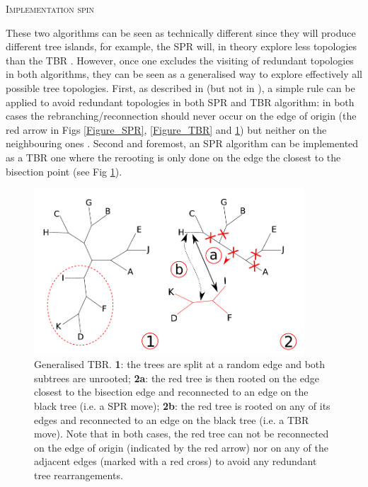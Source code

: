 \documentclass[12pt,letterpaper]{article}
\renewcommand{\section}[1]{%
\bigskip
\begin{center}
\begin{Large}
\normalfont\scshape #1
\medskip
\end{Large}
\end{center}}
\begin{document}
\section{Implementation spin}
These two algorithms can be seen as technically different since they will produce different tree islands, for example, the SPR will, in theory explore less topologies than the TBR \citep[see above and][]{morrison2007increasing,lakner2008efficiency}.
However, once one excludes the visiting of redundant topologies in both algorithms, they can be seen as a generalised way to explore effectively all possible tree topologies.
First, as described in \cite{allen2001subtree} (but not in \citealt{felsenstein2004inferring}), a simple rule can be applied to avoid redundant topologies in both SPR and TBR algorithm: in both cases the rebranching/reconnection should never occur on the edge of origin (the red arrow in Figs \ref{Figure_SPR}, \ref{Figure_TBR} and \ref{Figure_TBR_modif}) but neither on the neighbouring ones \citep{allen2001subtree}.
Second and foremost, an SPR algorithm can be implemented as a TBR one where the rerooting is only done on the edge the closest to the bisection point (see Fig \ref{Figure_TBR_modif}).

\begin{figure}[!htbp]
\centering
   \includegraphics[width=0.9\textwidth]{Figure/TBR_modif.pdf}
\caption{Generalised TBR. \textbf{1}: the trees are split at a random edge and both subtrees are unrooted; \textbf{2a}: the red tree is then rooted on the edge closest to the bisection edge and reconnected to an edge on the black tree (i.e. a SPR move); \textbf{2b}: the red tree is rooted on any of its edges and reconnected to an edge on the black tree (i.e. a TBR move). Note that in both cases, the red tree can not be reconnected on the edge of origin (indicated by the red arrow) nor on any of the adjacent edges (marked with a red cross) to avoid any redundant tree rearrangements.}
\label{Figure_TBR_modif}
\end{figure}
\end{document}
